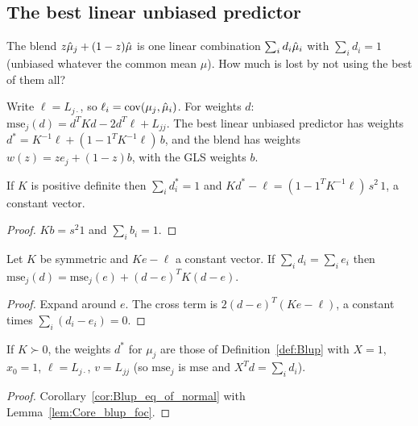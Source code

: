 \subsection*{The best linear unbiased predictor}

The blend $z\hat\mu_j + (1-z)\hat\mu$ is one linear combination $\sum_i d_i\hat\mu_i$
with $\sum_i d_i = 1$ (unbiased whatever the common mean $\mu$). How much is
lost by not using the best of them all?

\begin{definition}\label{def:Core_blup}
  \leanok
  Write $\ell = L_{j\cdot}$, so $\ell_i = \operatorname{cov}(\mu_j, \hat\mu_i)$. For weights $d$:
  $\mathrm{mse}_j(d) = d^TKd - 2d^T\ell + L_{jj}$. The best linear unbiased
  predictor has weights $d^* = K^{-1}\ell + (1 - 1^TK^{-1}\ell)\,b$, and the
  blend has weights $w(z) = z e_j + (1-z)b$, with the GLS weights $b$.
\end{definition}

\begin{lemma}\label{lem:Core_blup_foc}
  \leanok
  If $K$ is positive definite then $\sum_i d^*_i = 1$ and
  $Kd^* - \ell = (1 - 1^TK^{-1}\ell)\,s^2\,1$, a constant vector.
\end{lemma}
\begin{proof}
  \leanok
  $Kb = s^2 1$ and $\sum_i b_i = 1$.
\end{proof}

\begin{lemma}\label{lem:Core_linMse_pythagoras}
  \leanok
  Let $K$ be symmetric and $Ke - \ell$ a constant vector. If
  $\sum_i d_i = \sum_i e_i$ then
  $\mathrm{mse}_j(d) = \mathrm{mse}_j(e) + (d-e)^TK(d-e)$.
\end{lemma}
\begin{proof}
  \leanok
  Expand around $e$. The cross term is $2(d-e)^T(Ke - \ell)$, a constant times
  $\sum_i (d_i - e_i) = 0$.
\end{proof}

\begin{lemma}[One common mean is the case $X = 1$]\label{lem:Core_blupWeight_eq_blup}
  \leanok
  If $K \succ 0$, the weights $d^*$ for $\mu_j$ are those of
  Definition~\ref{def:Blup} with $X = 1$, $x_0 = 1$, $\ell = L_{j\cdot}$, $v = L_{jj}$
  (so $\mathrm{mse}_j$ is $\mathrm{mse}$ and $X^Td = \sum_i d_i$).
\end{lemma}
\begin{proof}
  \leanok
  Corollary~\ref{cor:Blup_eq_of_normal} with Lemma~\ref{lem:Core_blup_foc}.
\end{proof}

